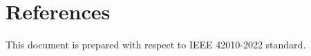 \section{References}

This document is prepared with respect to IEEE 42010-2022 \cite{ieee42010} standard.

\printbibliography
